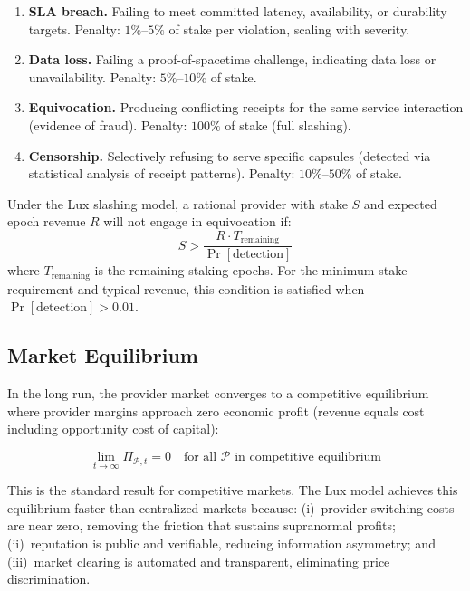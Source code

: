 \begin{enumerate}
    \item \textbf{SLA breach.} Failing to meet committed latency, availability,
    or durability targets. Penalty: $1\%$--$5\%$ of stake per violation,
    scaling with severity.

    \item \textbf{Data loss.} Failing a proof-of-spacetime challenge, indicating
    data loss or unavailability. Penalty: $5\%$--$10\%$ of stake.

    \item \textbf{Equivocation.} Producing conflicting receipts for the same
    service interaction (evidence of fraud). Penalty: $100\%$ of stake
    (full slashing).

    \item \textbf{Censorship.} Selectively refusing to serve specific capsules
    (detected via statistical analysis of receipt patterns). Penalty:
    $10\%$--$50\%$ of stake.
\end{enumerate}

\begin{proposition}
Under the Lux slashing model, a rational provider with stake $S$ and
expected epoch revenue $R$ will not engage in equivocation if:
\begin{equation}
    S > \frac{R \cdot T_{\text{remaining}}}{\Pr[\text{detection}]}
\end{equation}
where $T_{\text{remaining}}$ is the remaining staking epochs. For the
minimum stake requirement and typical revenue, this condition is satisfied
when $\Pr[\text{detection}] > 0.01$.
\end{proposition}

\subsection{Market Equilibrium}

In the long run, the provider market converges to a competitive equilibrium
where provider margins approach zero economic profit (revenue equals cost
including opportunity cost of capital):

\begin{equation}
    \lim_{t \to \infty} \Pi_{\mathcal{P}, t} = 0 \quad \text{for all } \mathcal{P} \text{ in competitive equilibrium}
\end{equation}

This is the standard result for competitive markets. The Lux model achieves
this equilibrium faster than centralized markets because: (i)~provider
switching costs are near zero, removing the friction that sustains
supranormal profits; (ii)~reputation is public and verifiable, reducing
information asymmetry; and (iii)~market clearing is automated and
transparent, eliminating price discrimination.

